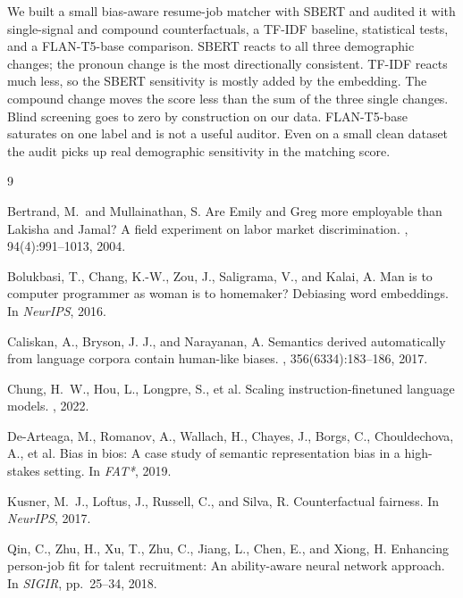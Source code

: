 \documentclass{article}
\begin{document}
We built a small bias-aware resume-job matcher with SBERT and audited it with single-signal and compound counterfactuals, a TF-IDF baseline, statistical tests, and a FLAN-T5-base comparison. SBERT reacts to all three demographic changes; the pronoun change is the most directionally consistent. TF-IDF reacts much less, so the SBERT sensitivity is mostly added by the embedding. The compound change moves the score less than the sum of the three single changes. Blind screening goes to zero by construction on our data. FLAN-T5-base saturates on one label and is not a useful auditor. Even on a small clean dataset the audit picks up real demographic sensitivity in the matching score.




\begin{thebibliography}{9}

Bertrand, M.\ and Mullainathan, S.
\newblock Are Emily and Greg more employable than Lakisha and Jamal? A field experiment on labor market discrimination.
, 94(4):991--1013, 2004.

Bolukbasi, T., Chang, K.-W., Zou, J., Saligrama, V., and Kalai, A.
\newblock Man is to computer programmer as woman is to homemaker? Debiasing word embeddings.
\newblock In {\em NeurIPS}, 2016.

Caliskan, A., Bryson, J. J., and Narayanan, A.
\newblock Semantics derived automatically from language corpora contain human-like biases.
, 356(6334):183--186, 2017.

Chung, H.~W., Hou, L., Longpre, S., et al.
\newblock Scaling instruction-finetuned language models.
, 2022.

De-Arteaga, M., Romanov, A., Wallach, H., Chayes, J., Borgs, C., Chouldechova, A., et al.
\newblock Bias in bios: A case study of semantic representation bias in a high-stakes setting.
\newblock In {\em FAT*}, 2019.

Kusner, M.~J., Loftus, J., Russell, C., and Silva, R.
\newblock Counterfactual fairness.
\newblock In {\em NeurIPS}, 2017.

Qin, C., Zhu, H., Xu, T., Zhu, C., Jiang, L., Chen, E., and Xiong, H.
\newblock Enhancing person-job fit for talent recruitment: An ability-aware neural network approach.
\newblock In {\em SIGIR}, pp.\ 25--34, 2018.


\end{thebibliography}
\end{document}
